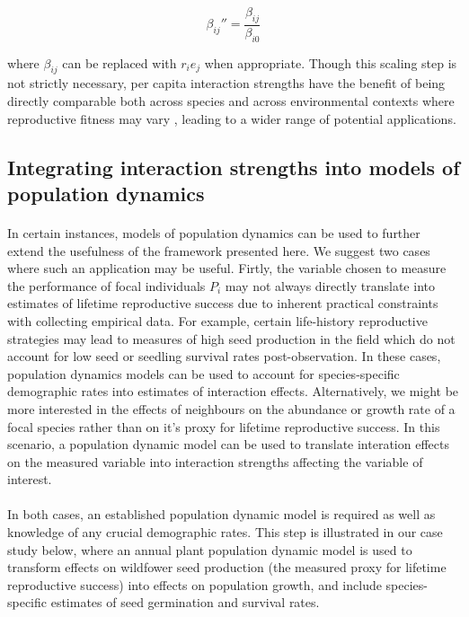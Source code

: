\documentclass[a4,12pt]{article}
\begin{document}
        \begin{equation}
        {\beta_{ij}}'' = \frac{\beta_{ij}}{\beta_{i0}}
        \label{scaling}
        \end{equation}

        where $\beta_{ij}$ can be replaced with $r_i e_j$ when appropriate. Though this scaling step is not strictly necessary, per capita interaction strengths have the benefit of being directly comparable both across species and across environmental contexts where reproductive fitness may vary \parencite{Wootton2005}, leading to a wider range of potential applications.

    \subsection{Integrating interaction strengths into models of population dynamics}

        \paragraph{}
        In certain instances, models of population dynamics can be used to further extend the usefulness of the framework presented here. We suggest two cases where such an application may be useful. Firtly, the variable chosen to measure the performance of focal individuals $P_i$ may not always directly translate into estimates of lifetime reproductive success due to inherent practical constraints with collecting empirical data. For example, certain life-history reproductive strategies may lead to measures of high seed production in the field which do not account for low seed or seedling survival rates post-observation. In these cases, population dynamics models can be used to account for species-specific demographic rates into estimates of interaction effects. Alternatively, we might be more interested in the effects of neighbours on the abundance or growth rate of a focal species rather than on it's proxy for lifetime reproductive success. In this scenario, a population dynamic model can be used to translate interation effects on the measured variable into interaction strengths affecting the variable of interest. 

        \paragraph{}
        In both cases, an established population dynamic model is required as well as knowledge of any crucial demographic rates. This step is illustrated in our case study below, where an annual plant population dynamic model is used to transform effects on wildfower seed production (the measured proxy for lifetime reproductive success) into effects on population growth, and include species-specific estimates of seed germination and survival rates. 
\end{document}
